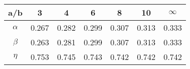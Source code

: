 \begin{table}[H]
	\centering
	\begin{tabular}{ccccccc}
		a/b & 3 & 4 & 6 & 8 & 10 & $\infty$ \\ \toprule
		$\alpha$ & 0.267 & 0.282 & 0.299 & 0.307 & 0.313 & 0.333 \\ \cmidrule{1-7}
		$\beta$ & 0.263 & 0.281 & 0.299 & 0.307 & 0.313 & 0.333 \\ \cmidrule{1-7}
		$\eta$ & 0.753 & 0.745 & 0.743 & 0.742 & 0.742 & 0.742 \\ \cmidrule{1-7}  
	\end{tabular}
	\label{tab:my_label}
\end{table}
